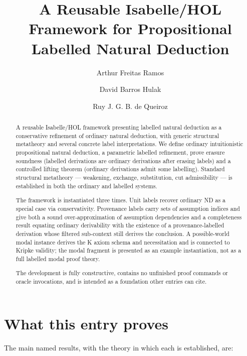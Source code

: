 \documentclass[11pt,a4paper]{article}
\begin{document}
\title{A Reusable Isabelle/HOL Framework for Propositional Labelled Natural Deduction}
\author{Arthur Freitas Ramos \and David Barros Hulak \and Ruy J. G. B. de Queiroz}
\maketitle

\begin{abstract}
A reusable Isabelle/HOL framework presenting labelled natural deduction
as a conservative refinement of ordinary natural deduction, with generic
structural metatheory and several concrete label interpretations. We
define ordinary intuitionistic propositional natural deduction, a
parametric labelled refinement, prove erasure soundness (labelled
derivations are ordinary derivations after erasing labels) and a
controlled lifting theorem (ordinary derivations admit some labelling).
Standard structural metatheory --- weakening, exchange, substitution,
cut admissibility --- is established in both the ordinary and labelled
systems.

The framework is instantiated three times. Unit labels recover ordinary
ND as a special case via conservativity. Provenance labels carry sets
of assumption indices and give both a sound over-approximation of
assumption dependencies and a completeness result equating ordinary
derivability with the existence of a provenance-labelled derivation
whose filtered sub-context still derives the conclusion. A
possible-world modal instance derives the K axiom schema and
necessitation and is connected to Kripke validity; the modal fragment
is presented as an example instantiation, not as a full labelled modal
proof theory.

The development is fully constructive, contains no unfinished proof
commands or oracle invocations, and is intended as a foundation other
entries can cite.
\end{abstract}

\tableofcontents
\newpage

\section{What this entry proves}

The main named results, with the theory in which each is established, are:
\end{document}
